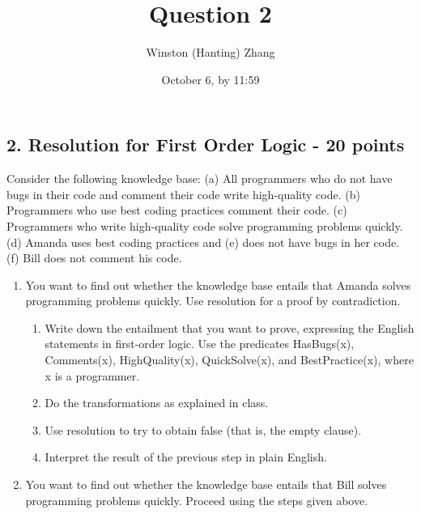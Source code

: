 \documentclass[10pt]{article}
\title{\bf Question 2}
\author{Winston (Hanting) Zhang}
\date{October 6, by 11:59}
\begin{document}
\subsection*{2. Resolution for First Order Logic - 20 points}
Consider the following knowledge base: (a) All programmers who do not have bugs in their code and comment their code write high-quality code. (b) Programmers who use best coding practices comment their code. (c) Programmers who write high-quality code solve programming problems quickly. (d) Amanda uses best coding practices and (e) does not have bugs in her code. (f) Bill does not comment his code.

\begin{enumerate}
    \item You want to find out whether the knowledge base entails that Amanda solves programming problems quickly. Use resolution for a proof by contradiction.
    \begin{enumerate}
        \item Write down the entailment that you want to prove, expressing the English statements in first-order logic. Use the predicates HasBugs(x), Comments(x), HighQuality(x), QuickSolve(x), and BestPractice(x), where x is a programmer.
        \item Do the transformations as explained in class.
        \item Use resolution to try to obtain false (that is, the empty clause).
        \item Interpret the result of the previous step in plain English.
    \end{enumerate}
    \item You want to find out whether the knowledge base entails that Bill solves programming problems quickly. Proceed using the steps given above.
\end{enumerate}
\end{document}
